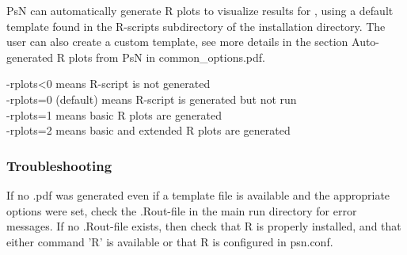 PsN can automatically generate R plots to visualize results for \guidetoolname, using a default template found in the R-scripts subdirectory of the installation directory. The user can also create a custom template, see more details in the section Auto-generated R plots from PsN in common\_options.pdf.

\rplotsconditions

\begin{optionlist}
-rplots<0 means R-script is not generated\\ 
-rplots=0 (default) means R-script is generated but not run\\ 
-rplots=1 means basic R plots are generated\\													  
-rplots=2 means basic and extended R plots are generated\\													  
\nextopt
\end{optionlist}

\subsubsection*{Troubleshooting}
If no .pdf was generated even if a template file is available and the appropriate options were set, check the .Rout-file in the main run directory for error messages. If no .Rout-file exists, then check that R is properly installed, and that either command 'R' is available or that R is configured in psn.conf.
